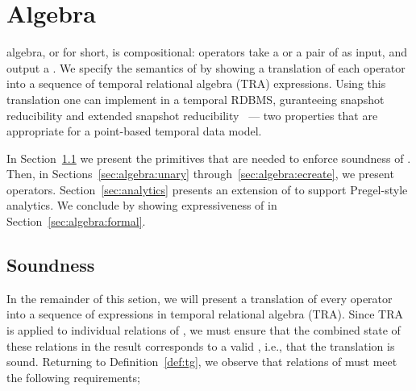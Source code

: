 \section{Algebra}
\label{sec:algebra}
\setlength{\textfloatsep}{5pt}%

\tg algebra, or \tga for short, is compositional: operators take a \tg
or a pair of \tgs as input, and output a \tg.  We specify the
semantics of \tga by showing a translation of each operator into a
sequence of temporal relational algebra (TRA) expressions.  Using this
translation one can implement \tra in a temporal RDBMS, guranteeing
snapshot reducibility and extended snapshot
reducibility~\cite{DBLP:reference/db/Bohlen092} --- two properties
that are appropriate for a point-based temporal data model.

In Section~\ref{sec:algebra:integrity} we present the primitives that
are needed to enforce soundness of \tga.  Then, in
Sections~\ref{sec:algebra:unary} through~\ref{sec:algebra:ecreate}, we
present \tga operators.  Section~\ref{sec:analytics} presents an
extension of \tga to support Pregel-style analytics.  We conclude by
showing expressiveness of \tga in Section~\ref{sec:algebra:formal}.

\subsection{Soundness}
\label{sec:algebra:integrity}

In the remainder of this setion, we will present a translation of
every \tga operator into a sequence of expressions in temporal
relational algebra (TRA).  Since TRA is applied to individual
relations of \tve, we must ensure that the combined state of these
relations in the result corresponds to a valid \tg, i.e., that the
translation is sound.  Returning to Definition~\ref{def:tg}, we
observe that relations of \tve must meet the following requirements;

